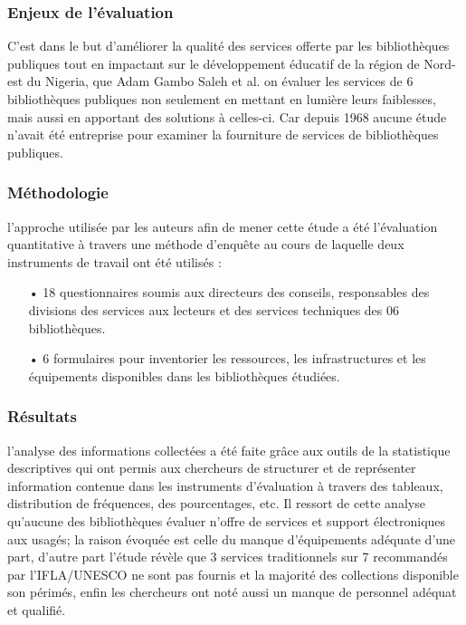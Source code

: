 \documentclass[french,a4paper,12pt]{article}
\begin{document}
\subsubsection{Enjeux de l'évaluation}
\quad C'est dans le but d'améliorer la qualité des services offerte par les bibliothèques publiques tout en impactant sur le développement éducatif de la région de Nord-est du Nigeria, que Adam Gambo Saleh et al. on évaluer les services de 6 bibliothèques publiques non seulement en mettant en lumière leurs faiblesses, mais aussi en apportant des solutions à celles-ci. Car depuis 1968 aucune étude n'avait été entreprise pour examiner la fourniture de services de bibliothèques publiques. \\

\subsubsection{Méthodologie}
\quad l'approche utilisée par les auteurs afin de mener cette étude a été l'évaluation quantitative à travers une méthode d'enquête au cours de laquelle deux instruments de travail ont été utilisés : 
\begin{enumerate}
\item[•]18 questionnaires soumis aux directeurs des conseils, responsables des divisions des services aux lecteurs et des services techniques des 06 bibliothèques.
\item[•]6 formulaires pour inventorier les ressources, les infrastructures et les équipements disponibles dans les bibliothèques étudiées.
\end{enumerate}

\subsubsection{Résultats}
\quad l'analyse des informations collectées a été faite grâce aux outils de la statistique descriptives qui ont permis aux chercheurs de structurer et de représenter information contenue dans les instruments d'évaluation à travers des tableaux, distribution de fréquences, des pourcentages, etc.
Il ressort de cette analyse qu'aucune des bibliothèques évaluer n'offre de services et support électroniques aux usagés; la raison évoquée est celle du manque d'équipements adéquate d'une part, d'autre part l'étude révèle que 3 services traditionnels sur 7 recommandés par l'IFLA/UNESCO ne sont pas fournis et la majorité des collections disponible son périmés, enfin les chercheurs ont noté aussi un manque de personnel adéquat et qualifié.\\
\end{document}
